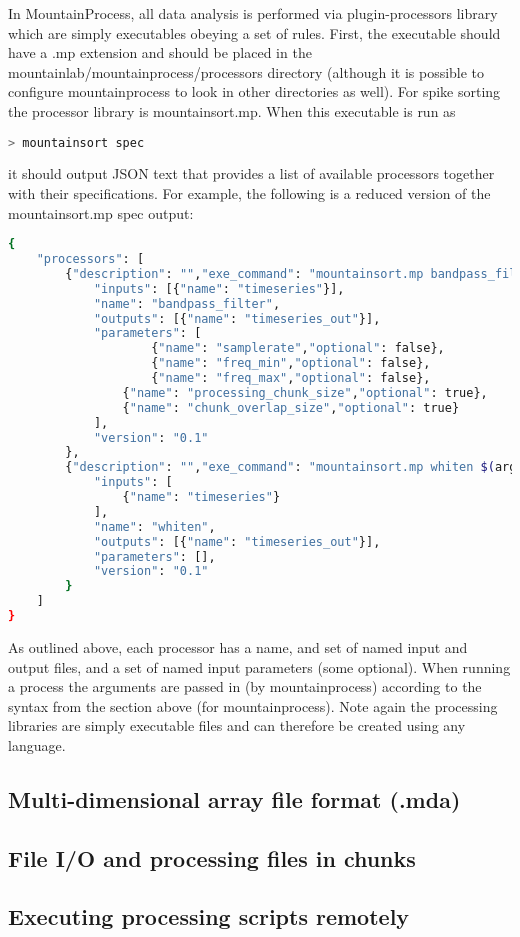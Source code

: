 \documentclass{article}
\begin{document}
In MountainProcess, all data analysis is performed via plugin-processors library which are simply executables obeying a set of rules. First, the executable should have a .mp extension and should be placed in the mountainlab/mountainprocess/processors directory (although it is possible to configure mountainprocess to look in other directories as well). For spike sorting the processor library is mountainsort.mp. When this executable is run as
\begin{lstlisting}[language=bash]
> mountainsort spec
\end{lstlisting}
it should output JSON text that provides a list of available processors together with their specifications. For example, the following is a reduced version of the mountainsort.mp spec output:
\begin{lstlisting}[language=bash]
{
    "processors": [
        {"description": "","exe_command": "mountainsort.mp bandpass_filter $(arguments)",
            "inputs": [{"name": "timeseries"}],
            "name": "bandpass_filter",
            "outputs": [{"name": "timeseries_out"}],
            "parameters": [
                    {"name": "samplerate","optional": false},
                    {"name": "freq_min","optional": false},
                    {"name": "freq_max","optional": false},
                {"name": "processing_chunk_size","optional": true},
                {"name": "chunk_overlap_size","optional": true}
            ],
            "version": "0.1"
        },
        {"description": "","exe_command": "mountainsort.mp whiten $(arguments)",
            "inputs": [
                {"name": "timeseries"}
            ],
            "name": "whiten",
            "outputs": [{"name": "timeseries_out"}],
            "parameters": [],
            "version": "0.1"
        }
    ]
}
\end{lstlisting}

As outlined above, each processor has a name, and set of named input and output files, and a set of named input parameters (some optional). When running a process the arguments are passed in (by mountainprocess) according to the syntax from the section above (for mountainprocess). Note again the processing libraries are simply executable files and can therefore be created using any language.

\subsection{Multi-dimensional array file format (.mda)}

\subsection{File I/O and processing files in chunks}

\subsection{Executing processing scripts remotely}
\end{document}
